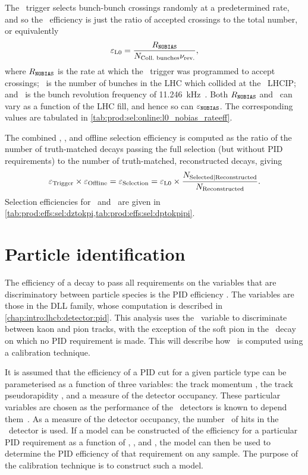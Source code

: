 The \lzero\ trigger selects bunch-bunch crossings randomly at a predetermined 
rate, and so the \lzero\ efficiency is just the ratio of accepted crossings to 
the total number, or equivalently
\begin{equation}
  \efflzero = \frac{%
    R_{\nobias}
  }{%
    \ncollbunches\revfreq
  },
  \label{eqn:prod:effs:sel:l0}
\end{equation}
where $R_{\texttt{NOBIAS}}$ is the rate at which the \lzero\ trigger was programmed to 
accept crossings; \ncollbunches\ is the number of bunches in the \ac{LHC} which 
collided at the \lhcb\ \acl{LHCIP}; and \revfreq\ is the bunch revolution 
frequency of \SI{11.246}{\kilo\hertz}~\cite{Bruning:2004ej}.
Both $R_{\texttt{NOBIAS}}$ and \ncollbunches\ can vary as a function of the \ac{LHC} 
fill, and hence so can $\varepsilon_{\texttt{NOBIAS}}$.
The corresponding values are tabulated in 
\cref{tab:prod:sel:online:l0_nobias_rateeff}.

The combined \hltone, \hlttwo, and offline selection efficiency is computed as 
the ratio of the number of truth-matched decays passing the full selection (but 
without \ac{PID} requirements) to the number of truth-matched, reconstructed 
decays, giving
\begin{equation}
  \efftrig \times \effoffline = \effselection = \efflzero \times \frac{%
    N_{\text{Selected}|\text{Reconstructed}}
  }{%
    N_{\text{Reconstructed}}
  }.
  \label{eqn:prod:effs:sel}
\end{equation}
Selection efficiencies for \DzToKpi\ and \DpToKpipi\ are given in 
\cref{tab:prod:effs:sel:dztokpi,tab:prod:effs:sel:dptokpipi}.

\section{Particle identification}
\label{chap:prod:effs:pid}

The efficiency of a decay to pass all requirements on the variables that are 
discriminatory between particle species is the \ac{PID} efficiency \effpid.
The variables are those in the \acf{DLL} family, whose computation is described 
in \cref{chap:intro:lhcb:detector:pid}.
This analysis uses the \dllkpi\ variable to discriminate between kaon and pion 
tracks, with the exception of the soft pion in the \DstToDzpi\ decay on which 
no \ac{PID} requirement is made.
This  will describe how \effpid\ is computed 
using a calibration technique.

It is assumed that the efficiency of a \ac{PID} cut for a given particle type 
can be parameterised as a function of three variables: the track momentum 
\ptot, the track pseudorapidity \Eta, and a measure of the detector occupancy.
These particular variables are chosen as the performance of the \rich\ 
detectors is known to depend them~\cite{Adinolfi:2012qfa}.
As a measure of the detector occupancy, the number \nspd\ of hits in the \spd\ 
detector is used.
If a model can be constructed of the efficiency for a particular \ac{PID} 
requirement as a function of \ptot, \Eta, and \nspd, the model can then be used 
to determine the \ac{PID} efficiency of that requirement on any sample.
The purpose of the calibration technique is to construct such a model.

